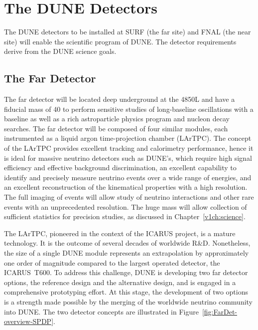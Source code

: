 \section{The DUNE Detectors}

The DUNE detectors to be installed at SURF (the far site) and FNAL (the near site) will enable the scientific program of DUNE.  The detector 
requirements derive from the DUNE science goals.

\subsection{The Far Detector}
The  far detector will be located deep underground at the 4850L and have
a  fiducial mass of \SI{40}{\kt} to perform sensitive studies of long-baseline oscillations with a  baseline as well as a rich astroparticle physics program and nucleon decay searches. The far detector  will be composed of four %
similar modules, each instrumented as a liquid argon time-projection chamber (LArTPC).
The concept of the LArTPC provides
excellent tracking and calorimetry performance, hence it is ideal for massive neutrino detectors such as DUNE's, which require high signal efficiency and effective background discrimination,  an excellent capability to identify and  precisely measure neutrino events over a wide range of energies, and an excellent reconstruction of the kinematical properties
with a high resolution. The full imaging of events will allow study of neutrino interactions and
other rare events with an unprecedented resolution.
 The huge mass will allow collection of sufficient statistics for precision
studies, as discussed in Chapter~\ref{v1ch:science}.

The LArTPC, pioneered in the context of the ICARUS project, is a mature technology. It is the outcome
of several decades of worldwide R\&D.  Nonetheless, the size of a single  DUNE module represents an extrapolation by approximately one order of magnitude compared to the largest operated detector, the ICARUS~T600. To address this challenge, DUNE is developing two far detector options, the reference design and the alternative design, and is engaged in a 
comprehensive prototyping effort. At this stage, the development of two options is a strength %
made possible by the merging of the worldwide neutrino community into DUNE.  The two detector
concepts are illustrated in Figure~\ref{fig:FarDet-overview-SPDP}.

